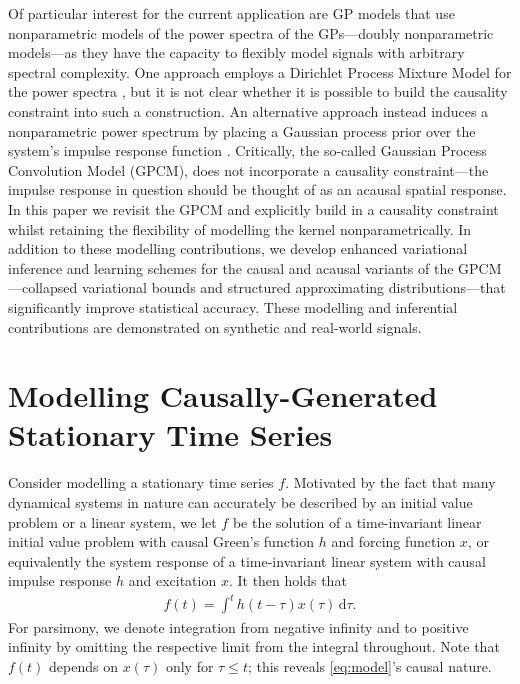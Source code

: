 \documentclass{article}
\newcommand{\id}[1]{\, \mathrm{d} #1}     %
\begin{document}
Of particular interest for the current application are GP models that use nonparametric models of the power spectra of the GPs---doubly nonparametric models---as they have the capacity to flexibly model signals with arbitrary spectral complexity. One approach employs a Dirichlet Process Mixture Model for the power spectra \cite{Oliva:2015:Bayesian_Nonparametric_Kernel-Learning}, but it is not clear whether it is possible to build the causality constraint into such a construction. An alternative approach instead induces a nonparametric power spectrum by placing a Gaussian process prior over the system's impulse response function \cite{Tobar:2015:Learning_Stationary}. Critically, the so-called Gaussian Process Convolution Model (GPCM), does not incorporate a causality constraint---the impulse response in question should be thought of as an acausal spatial response. In this paper we revisit the GPCM and explicitly build in a causality constraint whilst retaining the flexibility of modelling the kernel nonparametrically. In addition to these modelling contributions, we develop enhanced variational inference and learning schemes for the causal and acausal variants of the GPCM---collapsed variational bounds and structured approximating distributions---that significantly improve statistical accuracy. These modelling and inferential contributions are demonstrated on synthetic and real-world signals.

\section{Modelling Causally-Generated Stationary Time Series}
%
Consider modelling a stationary time series $f$. Motivated by the fact that many dynamical systems in nature can accurately be described by an initial value problem or a linear system, we let $f$ be the solution of a time-invariant linear initial value problem with causal Green's function $h$ and forcing function $x$, or equivalently the system response of a time-invariant linear system with causal impulse response $h$ and excitation $x$. It then holds that
\begin{align} \label{eq:model}
    f(t) = \int^t h(t- \tau)x(\tau)\id{\tau}.
\end{align}
For parsimony, we denote integration from negative infinity and to positive infinity by omitting the respective limit from the integral throughout.
Note that $f(t)$ depends on $x(\tau)$ only for $\tau \le t$; this reveals \cref{eq:model}'s causal nature.
\end{document}
